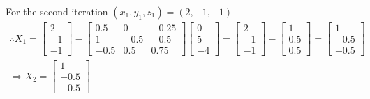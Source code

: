 \documentclass{article}
\begin{document}
For the second iteration $(x_{1},y_{1}, z_{1}) = (2,-1,-1)$
\begin{gather*}
  \therefore X_{1} =
  \begin{bmatrix}
    2\\
    -1\\
    -1
  \end{bmatrix} -
  \begin{bmatrix}
    0.5 & 0 & -0.25\\
    1 & -0.5 & -0.5 \\
    -0.5 & 0.5 & 0.75
  \end{bmatrix}
  \begin{bmatrix}
    0 \\
    5 \\
    -4
  \end{bmatrix} =
  \begin{bmatrix}
    2 \\ -1\\ -1
  \end{bmatrix} -
  \begin{bmatrix}
    1 \\ 0.5 \\ 0.5
  \end{bmatrix} =
  \begin{bmatrix}
    1 \\ -0.5 \\ -0.5
  \end{bmatrix}\\
  \Rightarrow X_{2} = \begin{bmatrix} 1 \\ -0.5 \\ -0.5 \end{bmatrix}
\end{gather*}
\end{document}
